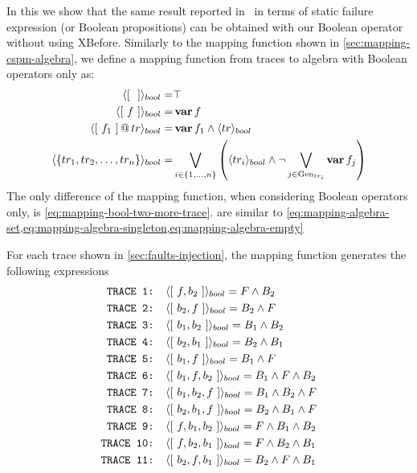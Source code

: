 In this  we show that the same result reported in~\cite{DM2012} in terms of static failure expression (or Boolean propositions) can be obtained with our Boolean operator without using \ac{XBefore}.
Similarly to the mapping function shown in \cref{sec:mapping-cspm-algebra}, we define a mapping function from traces to \ac{algebra} with Boolean operators only as:
%
\begin{subequations}
\begin{align}
\tracetobool{\trace{}} = & \top\label{eq:mapping-bool-empty}\\
%
\tracetobool{\trace{f}} = & \var{f}\label{eq:mapping-bool-singleton}\\
%
\tracetobool{\append{\trace{f_1}}{tr}} = & 
    \var{f_1} \land \tracetobool{tr}\label{eq:mapping-bool-two-more-trace}\\
%
\tracetobool{\left\{ tr_1, tr_2, \ldots, tr_n  \right\}} =& 
  \bigvee_{i \in \left\{1,\ldots,n\right\}} 
  \left(\tracetobool{tr_i} \land 
  \lnot \bigvee_{j \in \generators_{tr_i}} \var{f_j}\right)\label{eq:mapping-bool-set}
\end{align}
\end{subequations}
%
The only difference of the mapping function, when considering Boolean operators only, is \cref{eq:mapping-bool-two-more-trace}.
 are similar to \cref{eq:mapping-algebra-set,eq:mapping-algebra-singleton,eq:mapping-algebra-empty}

For each trace shown in \cref{sec:faults-injection}, the mapping function generates the following expressions
%
\begin{align*}
\text{\texttt{TRACE 1: }}&\langle{\ensuremath\left[~f,b_2~\right]}\rangle_{bool} = F \land B_2 \\
\text{\texttt{TRACE 2: }}&\langle{\ensuremath\left[~b_2,f~\right]}\rangle_{bool} = B_2 \land F \\
\text{\texttt{TRACE 3: }}&\langle{\ensuremath\left[~b_1,b_2~\right]}\rangle_{bool} = B_1 \land B_2 \\
\text{\texttt{TRACE 4: }}&\langle{\ensuremath\left[~b_2,b_1~\right]}\rangle_{bool} = B_2 \land B_1 \\
\text{\texttt{TRACE 5: }}&\langle{\ensuremath\left[~b_1,f~\right]}\rangle_{bool} = B_1 \land F \\
\text{\texttt{TRACE 6: }}&\langle{\ensuremath\left[~b_1,f,b_2~\right]}\rangle_{bool} = B_1 \land F \land B_2 \\
\text{\texttt{TRACE 7: }}&\langle{\ensuremath\left[~b_1,b_2,f~\right]}\rangle_{bool} = B_1 \land B_2 \land F \\
\text{\texttt{TRACE 8: }}&\langle{\ensuremath\left[~b_2,b_1,f~\right]}\rangle_{bool} = B_2 \land B_1 \land F \\
\text{\texttt{TRACE 9: }}&\langle{\ensuremath\left[~f,b_1,b_2~\right]}\rangle_{bool} = F \land B_1 \land B_2 \\
\text{\texttt{TRACE 10: }}&\langle{\ensuremath\left[~f,b_2,b_1~\right]}\rangle_{bool} = F \land B_2 \land B_1 \\
\text{\texttt{TRACE 11: }}&\langle{\ensuremath\left[~b_2,f,b_1~\right]}\rangle_{bool} = B_2 \land F \land B_1 
\end{align*}


